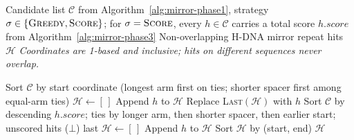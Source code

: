 \documentclass{article}
\begin{document}
\begin{algorithm}
\caption{HSeeker Phase 2: Overlap Removal}
\label{alg:mirror-phase2}
\small
\begin{algorithmic}[1]
\Require Candidate list $\mathcal{C}$ from Algorithm~\ref{alg:mirror-phase1},
         strategy $\sigma \in \{\textsc{Greedy}, \textsc{Score}\}$;
         for $\sigma = \textsc{Score}$, every $h \in \mathcal{C}$ carries a
         total score $h.\textit{score}$ from Algorithm~\ref{alg:mirror-phase3}
\Ensure Non-overlapping H-DNA mirror repeat hits $\mathcal{H}$
\Statex \textit{Coordinates are 1-based and inclusive; hits on different sequences never overlap.}

    \State Sort $\mathcal{C}$ by start coordinate (longest arm first on ties;
           shorter spacer first among equal-arm ties)
    \State $\mathcal{H} \gets [\,]$
            \State Append $h$ to $\mathcal{H}$ 
            \State Replace \textsc{Last}$(\mathcal{H})$ with $h$ 
        \EndIf
    \EndFor
\Else
    \State Sort $\mathcal{C}$ by descending $h.\textit{score}$; ties by longer arm,
           then shorter spacer, then earlier start;
           unscored hits ($\bot$) last
    \State $\mathcal{H} \gets [\,]$
            \State Append $h$ to $\mathcal{H}$
        \EndIf
    \EndFor
    \State Sort $\mathcal{H}$ by (start, end)
\EndIf
\State \Return $\mathcal{H}$
\end{algorithmic}
\end{algorithm}
\end{document}
